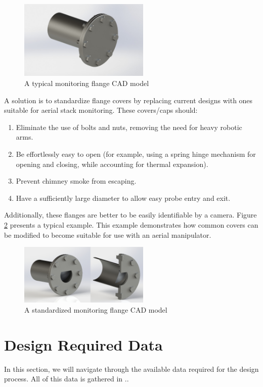 \documentclass[lettersize,journal]{IEEEtran}
\begin{document}
\begin{figure}[!t]
\centering
\includegraphics[width=2.45in]{./Pictures/TypicalFlangeAndCover}
\caption{A typical monitoring flange CAD model}
\label{fig.typflange}
\end{figure}

A solution is to standardize flange covers by replacing current designs with ones suitable for aerial stack monitoring. These covers/caps should:
\begin{enumerate}
\item Eliminate the use of bolts and nuts, removing the need for heavy robotic arms.
\item Be effortlessly easy to open (for example, using a spring hinge mechanism for opening and closing, while accounting for thermal expansion).
\item Prevent chimney smoke from escaping.
\item Have a sufficiently large diameter to allow easy probe entry and exit.
\end{enumerate}

Additionally, these flanges are better to be easily identifiable by a camera. Figure \ref{fig.stdflange} presents a typical example. This example demonstrates how common covers can be modified to become suitable for use with an aerial manipulator.

\begin{figure}[!t]
\centering
\includegraphics[width=2.45in]{./Pictures/StandardFlangeAndCoverDual}
\caption{A standardized monitoring flange CAD model}
\label{fig.stdflange}
\end{figure}

\section{Design Required Data}
In this section, we will navigate through the available data required for the design process. All of this data is gathered in \cite{githubrepo2025}..
\end{document}
